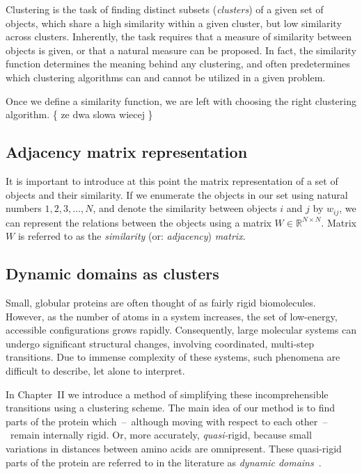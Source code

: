 \documentclass[a4paper,11pt,twoside]{book}%
\begin{document}
Clustering is the task of finding distinct subsets (\emph{clusters}) of a given set of objects, which share a high similarity within a given cluster, but low similarity across clusters.
Inherently, the task requires that a measure of similarity between objects is given, or that a natural measure can be proposed.
In fact, the similarity function determines the meaning behind any clustering, and often predetermines which clustering algorithms can and cannot be utilized in a given problem.

Once we define a similarity function, we are left with choosing the right clustering algorithm.
\{ ze dwa slowa wiecej \}


\subsection{Adjacency matrix representation}\label{sec:matrixRepresentation}

It is important to introduce at this point the matrix representation of a set of objects and their similarity.
If we enumerate the objects in our set using natural numbers $1,2,3,\ldots,N$, and denote the similarity between objects $i$ and $j$ by $w_{ij}$, we can represent the relations between the objects using a matrix $W\in\mathbb{R}^{N\times N}$.
Matrix $W$ is referred to as the \emph{similarity} (or: \emph{adjacency}) \emph{matrix}.

\subsection{Dynamic domains as clusters}

Small, globular proteins are often thought of as fairly rigid biomolecules.
However, as the number of atoms in a system increases, the set of low-energy, accessible configurations grows rapidly.
Consequently, large molecular systems can undergo significant structural changes, involving coordinated, multi-step transitions.
Due to immense complexity of these systems, such phenomena are difficult to describe, let alone to interpret.

In Chapter~II we introduce a method of simplifying these incomprehensible transitions using a clustering scheme.
The main idea of our method is to find parts of the protein which~--~although moving with respect to each other~--~remain internally rigid.
Or, more accurately, \emph{quasi-}rigid, because small variations in distances between amino acids are omnipresent.
These quasi-rigid parts of the protein are referred to in the literature as \emph{dynamic domains}~\cite{bahar1997direct,hayward1998systematic,hinsen1998analysis}.
\end{document}
